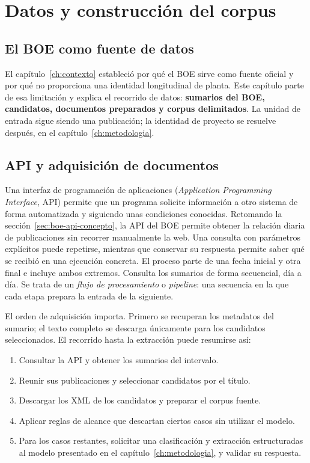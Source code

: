 \chapter{Datos y construcción del corpus}
\label{ch:datos}

\section{El BOE como fuente de datos}
El capítulo~\ref{ch:contexto} estableció por qué el BOE sirve como fuente
oficial y por qué no proporciona una identidad longitudinal de planta. Este
capítulo parte de esa limitación y explica el recorrido de datos:
\textbf{sumarios del BOE, candidatos, documentos preparados y corpus
delimitados}. La unidad de entrada sigue siendo una publicación; la identidad
de proyecto se resuelve después, en el capítulo~\ref{ch:metodologia}.

\section{API y adquisición de documentos}
\label{sec:adquisicion-api}
Una interfaz de programación de aplicaciones
(\textit{Application Programming Interface}, API) permite que un
programa solicite información a otro sistema de forma automatizada y siguiendo
unas condiciones conocidas. Retomando la sección~\ref{sec:boe-api-concepto},
la API del BOE permite obtener la relación diaria de publicaciones sin
recorrer manualmente la web. Una consulta con parámetros explícitos puede
repetirse, mientras que conservar su respuesta permite saber qué se recibió
en una ejecución concreta. El proceso
parte de una fecha inicial y otra final e incluye ambos extremos. Consulta
los sumarios de forma secuencial, día a día. Se trata de un
\emph{flujo de procesamiento} o \emph{pipeline}: una secuencia en la que cada
etapa prepara la entrada de la siguiente.

El orden de adquisición importa. Primero se recuperan los metadatos del
sumario; el texto completo se descarga únicamente para los candidatos
seleccionados. El recorrido hasta la extracción puede resumirse así:

\begin{enumerate}
\item Consultar la API y obtener los sumarios del intervalo.
\item Reunir sus publicaciones y seleccionar candidatos por el título.
\item Descargar los XML de los candidatos y preparar el corpus fuente.
\item Aplicar reglas de alcance que descartan ciertos casos sin utilizar el
modelo.
\item Para los casos restantes, solicitar una clasificación y extracción
estructuradas al modelo presentado en el capítulo~\ref{ch:metodologia}, y
validar su respuesta.
\end{enumerate}

